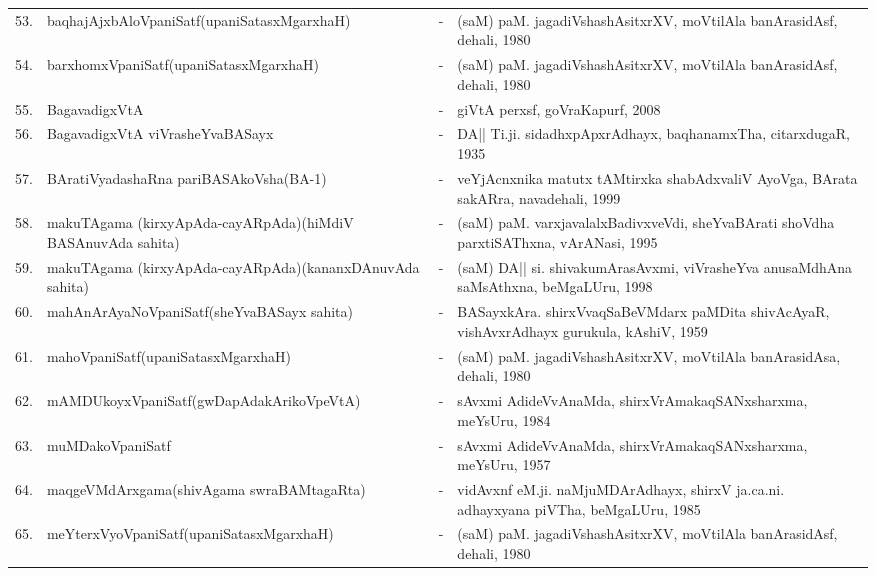 {\begin{longtable}{rp{6cm}cp{9cm}<{\raggedright}}
53. & baqhajAjxbAloVpaniSatf\newline (upaniSatasxMgarxhaH) &-& (saM) paM. jagadiVshashAsitxrXV, moVtilAla banArasidAsf, dehali, 1980\\
54. & barxhomxVpaniSatf\newline (upaniSatasxMgarxhaH) &-& (saM) paM. jagadiVshashAsitxrXV, moVtilAla banArasidAsf, dehali, 1980\\
55. & BagavadigxVtA &-& giVtA perxsf, goVraKapurf, 2008\\
56. & BagavadigxVtA viVrasheYvaBASayx &-& DA|| Ti.ji. sidadhxpApxrAdhayx, baqhanamxTha, citarxdugaR, 1935\\
57. & BAratiVyadashaRna pariBASAkoVsha\newline (BA-1) &-& veYjAcnxnika matutx tAMtirxka shabAdxvaliV AyoVga, BArata sakARra, navadehali, 1999\\
58. & makuTAgama (kirxyApAda-cayARpAda)\newline (hiMdiV BASAnuvAda sahita) &-& (saM) paM. varxjavalalxBadivxveVdi, sheYvaBArati shoVdha parxtiSAThxna, vArANasi, 1995\\
59. & makuTAgama (kirxyApAda-cayARpAda)\newline (kananxDAnuvAda sahita) &-& (saM) DA|| si. shivakumArasAvxmi, viVrasheYva anusaMdhAna saMsAthxna, beMgaLUru, 1998\\
60. & mahAnArAyaNoVpaniSatf\newline (sheYvaBASayx sahita) &-& BASayxkAra. shirxVvaqSaBeVMdarx paMDita shivAcAyaR, vishAvxrAdhayx gurukula, kAshiV, 1959\\
61. & mahoVpaniSatf\newline (upaniSatasxMgarxhaH) &-& (saM) paM. jagadiVshashAsitxrXV, moVtilAla banArasidAsa, dehali, 1980\\
62. & mAMDUkoyxVpaniSatf\newline (gwDapAdakArikoVpeVtA) &-& sAvxmi AdideVvAnaMda, shirxVrAmakaqSANxsharxma, meYsUru, 1984\\
63. & muMDakoVpaniSatf &-& sAvxmi AdideVvAnaMda, shirxVrAmakaqSANxsharxma, meYsUru, 1957\\
64. & maqgeVMdArxgama\newline (shivAgama swraBAMtagaRta) &-& vidAvxnf eM.ji. naMjuMDArAdhayx, shirxV ja.ca.ni. adhayxyana piVTha, beMgaLUru, 1985\\
65. & meYterxVyoVpaniSatf\newline (upaniSatasxMgarxhaH) &-& (saM) paM. jagadiVshashAsitxrXV, moVtilAla banArasidAsf, dehali, 1980\\

\end{longtable}}
